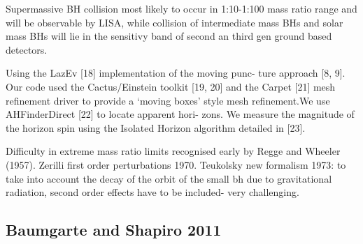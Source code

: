 \documentclass{article}
\begin{document}
Supermassive BH collision most likely to occur in 1:10-1:100 mass ratio range and will be observable by LISA, while collision of intermediate mass BHs and solar mass BHs will lie in the sensitivy band of second an third gen ground based detectors.

Using the LazEv [18] implementation of the moving punc- ture approach [8, 9]. Our code used the Cactus/Einstein toolkit [19, 20] and the Carpet [21] mesh refinement driver to provide a ‘moving boxes’ style mesh refinement.We use AHFinderDirect [22] to locate apparent hori- zons. We measure the magnitude of the horizon spin using the Isolated Horizon algorithm detailed in [23].

Difficulty in extreme mass ratio limits recognised early by Regge and Wheeler (1957). Zerilli first order perturbations 1970. Teukolsky new formalism 1973: to take into account the decay of the orbit of the small bh due to gravitational radiation, second order effects have to be included- very challenging. 

\subsection{Baumgarte and Shapiro 2011}
\end{document}
